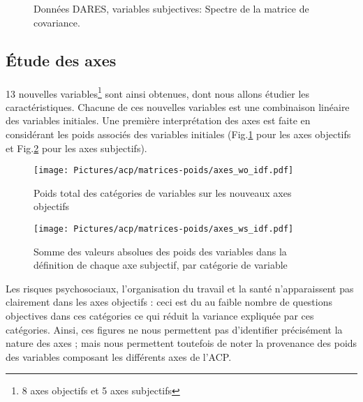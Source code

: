 \documentclass[11pt,fleqn,openany,frenchb]{book} %
\def\NOTE#1{\footnote{MS : #1}}
\begin{document}
\begin{figure}[!h]
    \centering
  \hspace{2pt}
  \caption{Données DARES, variables subjectives: Spectre de la matrice de covariance.}
\end{figure}

\subsection{\'Etude des axes }
\paragraph{}
13 nouvelles variables\footnote{8 axes objectifs et 5 axes subjectifs} sont ainsi obtenues, dont nous allons étudier les caractéristiques. Chacune de ces nouvelles variables est une combinaison linéaire des variables initiales. Une première interprétation des axes est faite en considérant les poids associés des variables initiales (Fig.\ref{fig:ACPobj} pour les axes objectifs et Fig.\ref{fig:ACPsubj} pour les axes subjectifs). 
\begin{figure}[!h]
    \centering
  \texttt{[image: Pictures/acp/matrices-poids/axes\_wo\_idf.pdf]}
    \caption{Poids total des catégories de variables sur les nouveaux axes objectifs}
    \label{fig:ACPobj}
\end{figure}


\begin{figure}[!h]
  \centering
  \texttt{[image: Pictures/acp/matrices-poids/axes\_ws\_idf.pdf]}
  \caption{Somme des valeurs absolues des poids des variables dans la définition de chaque axe subjectif, par catégorie de variable}
  \label{fig:ACPsubj}
\end{figure}

Les risques psychosociaux, l'organisation du travail et la santé n'apparaissent pas clairement dans les axes objectifs : ceci est du au faible nombre de questions objectives dans ces catégories %
ce qui réduit la variance expliquée par ces catégories.%
Ainsi, ces figures ne nous permettent pas d'identifier précisément la nature des axes ; mais nous permettent toutefois de noter la provenance des poids des variables composant les différents axes de l'ACP.
\end{document}
